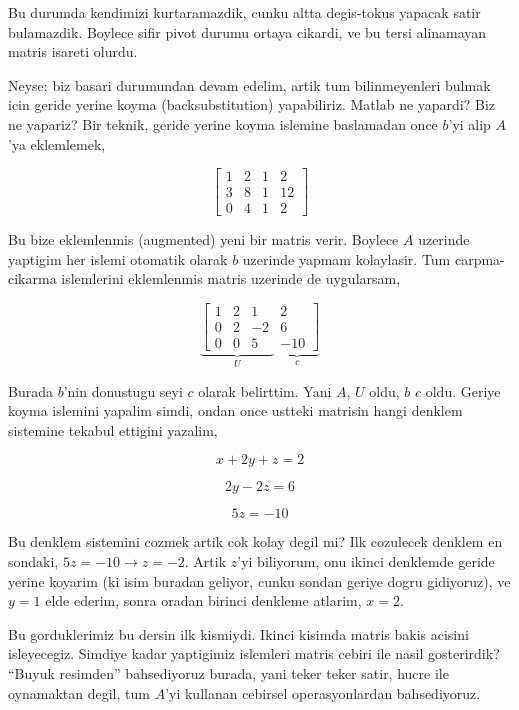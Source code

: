 \documentclass[12pt,fleqn]{article}\usepackage{../common}
\begin{document}
Bu durumda kendimizi kurtaramazdik, cunku altta degis-tokus yapacak satir
bulamazdik. Boylece sifir pivot durumu ortaya cikardi, ve bu tersi
alinamayan matris isareti olurdu.

Neyse; biz basari durumundan devam edelim, artik tum bilinmeyenleri bulmak
icin geride yerine koyma (backsubstitution) yapabiliriz. Matlab ne yapardi?
Biz ne yapariz? Bir teknik, geride yerine koyma islemine baslamadan once
$b$'yi alip $A$'ya eklemlemek,

$$ 
\left[\begin{array}{rrrr}
1 & 2 & 1 & 2\\
3 & 8 & 1 & 12 \\
0 & 4 & 1 & 2
\end{array}\right]
 $$

Bu bize eklemlenmis (augmented) yeni bir matris verir. Boylece $A$
uzerinde yaptigim her islemi otomatik olarak $b$ uzerinde yapmam
kolaylasir. Tum carpma-cikarma islemlerini eklemlenmis matris uzerinde de
uygularsam,

$$ 
\underbrace{
\left[\begin{array}{rrr}
1 & 2 & 1 \\
0 & 2 & -2 \\
0 & 0 & 5  
\end{array}\right.}_{U}
\underbrace{
\left. \begin{array}{r}
 2\\
 6\\
 -10 
\end{array}\right]}_{c}
 $$

Burada $b$'nin donustugu seyi $c$ olarak belirttim. Yani $A$, $U$ oldu,
$b$ $c$ oldu. Geriye koyma islemini yapalim simdi, ondan once ustteki
matrisin hangi denklem sistemine tekabul ettigini yazalim,

$$ x + 2y + z = 2 $$

$$ 2y -2z = 6 $$

$$ 5z = -10 $$

Bu denklem sistemini cozmek artik cok kolay degil mi? Ilk cozulecek denklem
en sondaki, $5z = -10 \rightarrow z = -2$. Artik $z$'yi biliyorum, onu
ikinci denklemde geride yerine koyarim (ki isim buradan geliyor, cunku
sondan geriye dogru gidiyoruz), ve $y = 1$ elde ederim, sonra oradan
birinci denkleme atlarim, $x = 2$. 

Bu gorduklerimiz bu dersin ilk kismiydi. Ikinci kisimda  matris bakis
acisini isleyecegiz. Simdiye kadar yaptigimiz islemleri matris cebiri ile
nasil gosterirdik? ``Buyuk resimden'' bahsediyoruz burada, yani teker teker
satir, hucre ile oynamaktan degil, tum $A$'yi kullanan cebirsel
operasyonlardan bahsediyoruz. 
\end{document}

